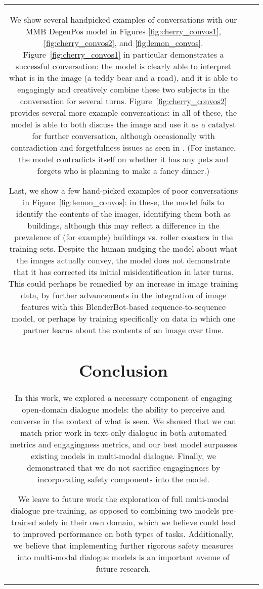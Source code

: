 \documentclass[11pt,a4paper]{article}
\begin{document}
\begin{table*}[t!]
\begin{adjustbox}{center=15.5cm}
\begin{small}
\begin{tabular*}{\textwidth}{ccl}
We show several handpicked examples of conversations with our MMB DegenPos model in Figures \ref{fig:cherry_convos1}, \ref{fig:cherry_convos2}, and \ref{fig:lemon_convos}. Figure~\ref{fig:cherry_convos1} in particular demonstrates a successful conversation: the model is clearly able to interpret what is in the image (a teddy bear and a road), and it is able to engagingly and creatively combine these two subjects in the conversation for several turns. Figure~\ref{fig:cherry_convos2} provides several more example conversations: in all of these, the model is able to both discuss the image and use it as a catalyst for further conversation, although occasionally with contradiction and forgetfulness issues as seen in \citet{roller2020recipes}. (For instance, the model contradicts itself on whether it has any pets and forgets who is planning to make a fancy dinner.)

Last, we show a few hand-picked examples of poor conversations in Figure~\ref{fig:lemon_convos}: in these, the model fails to identify the contents of the images, identifying them both as buildings, although this may reflect a difference in the prevalence of (for example) buildings vs. roller coasters in the training sets. Despite the human nudging the model about what the images actually convey, the model does not demonstrate that it has corrected its initial misidentification in later turns. This could perhaps be remedied by an increase in image training data, by further advancements in the integration of image features with this BlenderBot-based sequence-to-sequence model, or perhaps by training specifically on data in which one partner learns about the contents of an image over time.

\section{Conclusion}

In this work, we explored a necessary component of engaging open-domain dialogue models: the ability to perceive and converse in the context of what is seen. We showed that we can match prior work in text-only dialogue in both automated metrics and engagingness metrics, and our best model surpasses existing models in multi-modal dialogue. Finally, we demonstrated that we do not sacrifice engagingness by incorporating safety components into the model. 

We leave to future work the exploration of full multi-modal dialogue pre-training, as opposed to combining two models pre-trained solely in their own domain, which we believe could lead to improved performance on both types of tasks. Additionally, we believe that implementing further rigorous safety measures into multi-modal dialogue models is an important avenue of future research.



\end{tabular*}
\end{small}
\end{adjustbox}
\end{table*}
\end{document}
